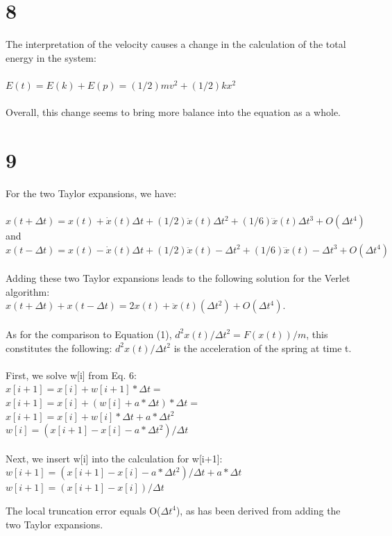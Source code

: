 \documentclass[12pt, a4paper]{article}
\begin{document}
	\part*{8}
	The interpretation of the velocity causes a change in the calculation of the total energy in the system:\\\\
	$E(t) = E(k) + E(p) = (1/2)mv^2 + (1/2)kx^2$\\\\
	Overall, this change seems to bring more balance into the equation as a whole.
	\part*{9}
	For the two Taylor expansions, we have:\\\\
	$x(t+\Delta t) = x(t) + \dot{x}(t)\Delta t + (1/2)\ddot{x}(t)\Delta t^2+(1/6)\dddot{x}(t)\Delta t^3+O(\Delta t^4)$\\
	and\\
	$x(t-\Delta t) = x(t) - \dot{x}(t)\Delta t  + (1/2)\ddot{x}(t)-\Delta t^2+(1/6)\dddot{x}(t)-\Delta t^3+O(\Delta t^4)$\\\\
	Adding these two Taylor expansions leads to the following solution for the Verlet algorithm:\\
	$x(t+\Delta t) + x(t-\Delta t) = 2x(t)+\ddot{x}(t)(\Delta t^2) + O(\Delta t^4)$.\\\\
	As for the comparison to Equation (1), $d^2x(t)/\Delta t^2 = F(x(t))/m$, this constitutes the following: $d^2x(t)/\Delta t^2$ is the acceleration of the spring at time t.\\\\
	First, we solve w[i] from Eq. 6:\\
	$x[i+1] = x[i] + w[i+1]*\Delta t =$\\
	$x[i+1] = x[i] + (w[i] + a*\Delta t)*\Delta t =$\\
	$x[i+1] = x[i] + w[i]*\Delta t + a*\Delta t^2$\\
	$w[i] = (x[i+1]-x[i]-a*\Delta t^2)/\Delta t$\\\\
	Next, we insert w[i] into the calculation for w[i+1]:\\
	$w[i+1] = (x[i+1]-x[i]-a*\Delta t^2)/\Delta t + a*\Delta t$\\
	$w[i+1] = (x[i+1] - x[i])/\Delta t$
	
	The local truncation error equals O($\Delta$$t^4$), as has been derived from adding the two Taylor expansions.
	\newpage
\end{document}
